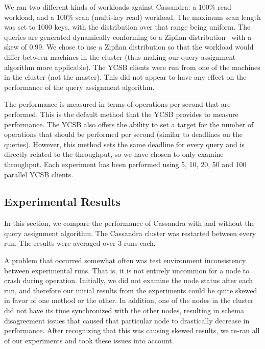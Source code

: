 We ran two different kinds of workloads against Cassandra: a 100\% read workload, and a 100\% scan (multi-key read) workload. The maximum scan length was set to 1000 keys, with the distribution over that range being uniform. The queries are generated dynamically conforming to a Zipfian distribution~\cite{Gray:1994:QGB:191843.191886} with a skew of 0.99. We chose to use a Zipfian distribution so that the workload would differ between machines in the cluster (thus making our query assignment algorithm more applicable). The YCSB clients were run from one of the machines in the cluster (not the master). This did not appear to have any effect on the performance of the query assignment algorithm. 

The performance is measured in terms of operations per second that are performed. This is the default method that the YCSB provides to measure performance. The YCSB also offers the ability to set a target for the number of operations that should be performed per second (similar to deadlines on the queries). However, this method sets the same deadline for every query and is directly related to the throughput, so we have chosen to only examine throughput. Each experiment has been performed using 5, 10, 20, 50 and 100 parallel YCSB clients.

\subsection{Experimental Results}
In this section, we compare the performance of Cassandra with and without the query assignment algorithm. The Cassandra cluster was restarted between every run. The results were averaged over 3 runs each.

A problem that occurred somewhat often was test environment inconsistency between experimental runs. That is, it is not entirely uncommon for a node to crash during operation. Initially, we did not examine the node status after each run, and therefore our initial results from the experiments could be quite skewed in favor of one method or the other. In addition, one of the nodes in the cluster did not have its time synchronized with the other nodes, resulting in schema disagreement issues that caused that particular node to drastically decrease in performance. After recognizing that this was causing skewed results, we re-ran all of our experiments and took these issues into account.

